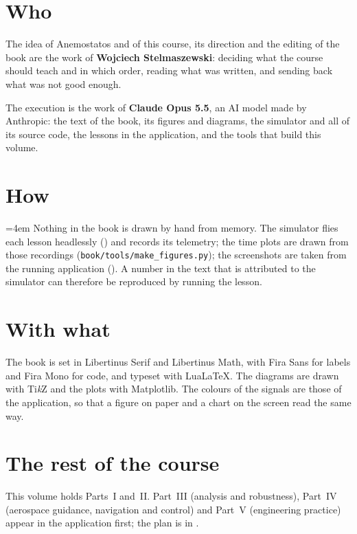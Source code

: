\label{ch:colophon}

\section*{Who}
The idea of Anemostatos and of this course, its direction and the editing of the book are the work of \textbf{Wojciech Stelmaszewski}: deciding what the course should teach and in which order, reading what was written, and sending back what was not good enough.

The execution is the work of \textbf{Claude Opus 5.5}, an AI model made by Anthropic: the text of the book, its figures and diagrams, the simulator and all of its source code, the lessons in the application, and the tools that build this volume.

\section*{How}
\emergencystretch=4em
Nothing in the book is drawn by hand from memory. The simulator flies each lesson headlessly () and records its telemetry; the time plots are drawn from those recordings (\texttt{book/tools/make\_figures.py}); the screenshots are taken from the running application (). A number in the text that is attributed to the simulator can therefore be reproduced by running the lesson.

\section*{With what}
The book is set in Libertinus Serif and Libertinus Math, with Fira Sans for labels and Fira Mono for code, and typeset with Lua\LaTeX. The diagrams are drawn with Ti\emph{k}Z and the plots with Matplotlib. The colours of the signals are those of the application, so that a figure on paper and a chart on the screen read the same way.

\section*{The rest of the course}
This volume holds Parts~I and~II. Part~III (analysis and robustness), Part~IV (aerospace guidance, navigation and control) and Part~V (engineering practice) appear in the application first; the plan is in .
